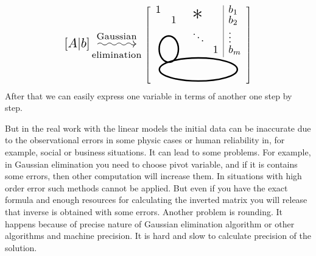     \[
        \scalebox{1.5}{$[A | b] \overset{\text{Gaussian}}{ \underset{\text{elimination}}{\xymatrix@C=3em{{}\ar@{~>}[r]&{}}}}$}
        \left[\begin{tabular}{clp{0.1cm}p{0.1cm}l}
            \multicolumn{1}{l}{\scalebox{1.25}{$1$}}        &         &\multicolumn{1}{l}{\multirow{2}{*}{\scalebox{2.5}{$\mathlarger{*}$}}}  & \multicolumn{1}{c|}{} & \scalebox{1.25}{$b_1$}    \\
\multicolumn{1}{l}{}         & \scalebox{1.25}{$1$}       & \multicolumn{1}{c}{} & \multicolumn{1}{c|}{}                   & \scalebox{1.25}{$b_2$}    \\
            \multicolumn{2}{c}{\multirow{2}{*}{
                \begin{tikzpicture}[x=0.75pt,y=0.75pt,yscale=-1,xscale=1]
                    \draw  [line width=1.75]  (304.32,138.5) .. controls (312.66,138.5) and (319.43,147.68) .. (319.43,159) .. controls (319.43,170.32) and (312.66,179.5) .. (304.32,179.5) .. controls (295.98,179.5) and (289.21,170.32) .. (289.21,159) .. controls (289.21,147.68) and (295.98,138.5) .. (304.32,138.5) -- cycle ;
                    \end{tikzpicture}
            }} & \scalebox{1.25}{$\ddots$}              & \multicolumn{1}{l|}{}  & \scalebox{1.25}{$\vdots$} \\
            \multicolumn{2}{c}{}                   &                       & \multicolumn{1}{l|}{\scalebox{1.25}{$1$}} & \scalebox{1.25}{$b_m$}    \\[0.05cm]
            \multicolumn{5}{c}{\begin{tikzpicture}[x=0.75pt,y=0.75pt,yscale=-1,xscale=1]
                \draw [line width=1.75]  (246,143.5) .. controls (246,133.56) and (273.41,125.5) .. (307.21,125.5) .. controls (341.02,125.5) and (368.43,133.56) .. (368.43,143.5) .. controls (368.43,153.44) and (341.02,161.5) .. (307.21,161.5) .. controls (273.41,161.5) and (246,153.44) .. (246,143.5) -- cycle ;
                \end{tikzpicture}
                }                                                                        
            \end{tabular}\right]
    \]
    After that we can easily express one variable in terms of another one step by step.
    \par
    But in the real work with the linear models the initial data can be inaccurate due to the observational errors in some physic cases or human reliability in, for example, social or business situations. It can lead to some problems. For example, in Gaussian elimination you need to choose pivot variable, and if it is contains some errors, then other computation will increase them. In situations with high order error such methods cannot be applied. But even if you have the exact formula and enough resources for calculating the inverted matrix you will release that inverse is obtained with some errors. Another problem is rounding. It happens because of precise nature of Gaussian elimination algorithm or other algorithms and machine precision. It is hard and slow to calculate precision of the solution.
